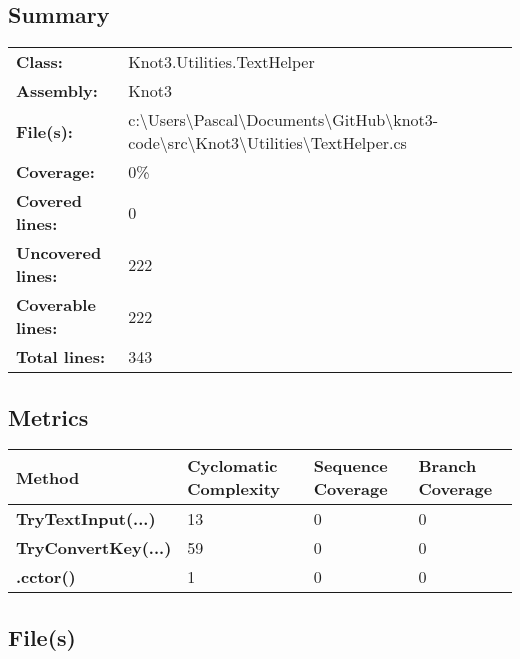 \documentclass[a4paper,10pt]{article}
\begin{document}
\subsection{Summary}
\begin{longtable}[l]{ll}
\textbf{Class:} & Knot3.Utilities.TextHelper\\
\textbf{Assembly:} & Knot3\\
\textbf{File(s):} & \begin{minipage}[t]{12cm}{c:\textbackslash Users\textbackslash Pascal\textbackslash Documents\textbackslash GitHub\textbackslash knot3-code\textbackslash src\textbackslash Knot3\textbackslash Utilities\textbackslash TextHelper.cs}\end{minipage} \\
\textbf{Coverage:} & 0\%\\
\textbf{Covered lines:} & 0\\
\textbf{Uncovered lines:} & 222\\
\textbf{Coverable lines:} & 222\\
\textbf{Total lines:} & 343\\
\end{longtable}
\subsection{Metrics}
\begin{longtable}[l]{|l|l|l|l|}
\hline
\textbf{Method} & \textbf{Cyclomatic Complexity} & \textbf{Sequence Coverage} & \textbf{Branch Coverage}\\
\hline
\textbf{TryTextInput(...)} & 13 & 0 & 0\\
\hline
\textbf{TryConvertKey(...)} & 59 & 0 & 0\\
\hline
\textbf{.cctor()} & 1 & 0 & 0\\
\hline
\end{longtable}
\subsection{File(s)}
\end{document}
